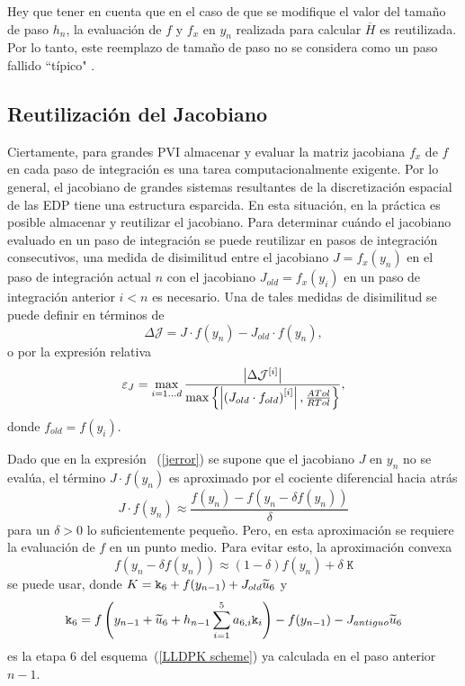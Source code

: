 Hey que tener en cuenta que en el caso de que se modifique el valor del tamaño de paso $h_{n}$, la evaluación de $f$ y $f_x$ en $y_n$ realizada para calcular $\overline{H}$ es reutilizada. Por lo tanto, este reemplazo de tamaño de paso no se considera como un paso fallido ``típico" .

\subsection{Reutilización del Jacobiano}\label{secc:jaccontrol}
Ciertamente, para grandes PVI almacenar y evaluar la matriz jacobiana $f_x$ de $f$ en cada paso de integración es una tarea computacionalmente exigente. Por lo general, el jacobiano de grandes sistemas resultantes de la discretización espacial de las EDP tiene una estructura esparcida. En esta situación, en la práctica es posible almacenar y reutilizar el jacobiano. Para determinar cuándo el jacobiano evaluado en un paso de integración se puede reutilizar en pasos de integración consecutivos, una medida de disimilitud entre el jacobiano $J=f_x(y_n)$ en el paso de integración actual $n$ con el jacobiano $J_{old}= f_x(y_{i})$ en un paso de integración anterior $i<n$ es necesario. Una de tales medidas de disimilitud se puede definir en términos de
\begin{equation*}
    \Delta \mathcal{J} = J\cdot f(y_n) - J_{old}\cdot f(y_n),
\end{equation*}
o por la expresión relativa
\begin{equation}\label{jerror}
    \varepsilon_J = \max_{i=1\ldots d}\frac{\left\lvert \Delta \mathcal{J}^{[i]} \right\rvert}
    {\max\left\{ \left\lvert  \left(J_{old}\cdot f_{old}\right)^{[i]}  \right\rvert ,\frac{ATol}{RTol} \right\}},
\end{equation}
donde $f_{old}=f(y_i)$.

Dado que en la expresión ~(\ref{jerror}) se supone que el jacobiano $J$ en $y_n$ no se evalúa, el término $J\cdot f(y_n)$ es
aproximado por el cociente diferencial hacia atrás
\begin{equation}\label{backapprox}
    J\cdot f(y_n) \approx \frac{f(y_n) -
        f\left(y_n-\delta f(y_n)\right)}{\delta}
\end{equation}
para un $\delta>0$ lo suficientemente pequeño. Pero, en esta aproximación se requiere la evaluación de $f$ en un punto medio. Para evitar esto, la aproximación convexa
\begin{equation}\label{aproxaprox}
    f\left(y_n-\delta f(y_n)\right) \approx
    (1-\delta) f(y_n)+ \delta \; \mathtt{K}
\end{equation}
se puede usar, donde $K = \mathtt{k}_{6} + f(y_{n-1}) + J_{old}\widetilde{u}_{6} $ y
\[ \mathtt{k}_6 = f\left( y_{n-1}+\widetilde{u}_6+h_{n-1} \sum_{i=1}^{5}a_{6,i}\mathtt{k}_i \right) - f(y_{n-1}) - J_{antiguo}\widetilde{u}_6 \]
es la etapa $6$ del esquema~(\ref{LLDPK scheme}) ya calculada en el paso anterior $n-1$.

